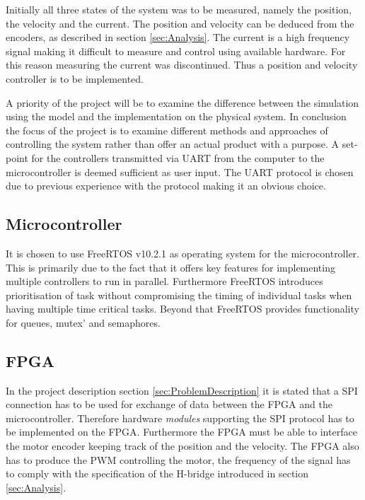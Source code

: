 \documentclass[../../main.tex]{subfiles}
\begin{document}
Initially all three states of the system was to be measured, namely the position, the velocity and the current. The position and velocity can be deduced from the encoders, as described in section \ref{sec:Analysis}. The current is a high frequency signal making it difficult to measure and control using available hardware. For this reason measuring the current was discontinued. Thus a position and velocity controller is to be implemented.

A priority of the project will be to examine the difference between the simulation using the model and the implementation on the physical system. In conclusion the focus of the project is to examine different methods and approaches of controlling the system rather than offer an actual product with a purpose. A set-point for the controllers transmitted via UART from the computer to the microcontroller is deemed sufficient as user input. The UART protocol is chosen due to previous experience with the protocol making it an obvious choice. 



\subsection*{Microcontroller}
It is chosen to use FreeRTOS v10.2.1 as operating system for the microcontroller. This is primarily due to the fact that it offers key features for implementing multiple controllers to run in parallel. Furthermore FreeRTOS introduces prioritisation of task without compromising the timing of individual tasks when having multiple time critical tasks. Beyond that FreeRTOS provides functionality for queues, mutex' and semaphores.




\subsection*{FPGA}
In the project description section \ref{sec:ProblemDescription} it is stated that a SPI connection has to be used for exchange of data between the FPGA and the microcontroller. Therefore hardware \textit{modules} supporting the SPI protocol has to be implemented on the FPGA. Furthermore the FPGA must be able to interface the motor encoder keeping track of the position and the velocity. The FPGA also has to produce the PWM controlling the motor, the frequency of the signal has to comply with the specification of the H-bridge introduced in section \ref{sec:Analysis}.
\end{document}
